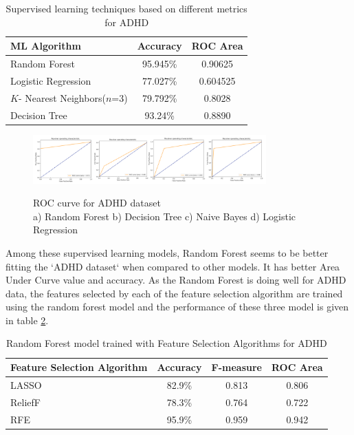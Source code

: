 \begin{table}[h]
\begin{center}
\begin{tabular}{|l|c|c|}
\hline
\textbf{ML Algorithm }& \textbf{Accuracy}&	\textbf{ROC Area}\\
\hline \hline
Random Forest&	95.945\%&	0.90625\\
\hline
Logistic Regression&	77.027\%&	0.604525\\
\hline
$K$- Nearest Neighbors($n$=3)&	79.792\%	&0.8028\\
\hline
Decision Tree&	93.24\%&	0.8890\\
\hline
\end{tabular}
\end{center}
\caption{Supervised learning techniques based on different metrics for ADHD }
\label{table:67}
\end{table}

\begin{figure}
\centering
  {\includegraphics[width=0.8\textwidth]{Figures/Figure_6_3.png}}
  \caption{ ROC curve for ADHD dataset \\ a) Random Forest b) Decision Tree c) Naive Bayes d) Logistic Regression }
  \label{fig:63}
\end{figure}

Among these supervised learning models, Random Forest seems to be better fitting the `ADHD dataset` when compared to other models. It has better Area Under Curve value and accuracy. As the Random Forest is doing well for ADHD data, the features selected by each of the feature selection algorithm are trained using the random forest model and the performance of these three model is given in table \ref{table:68}.
\begin{table}[h]
\begin{center}
\begin{tabular}{|l|c|c|c|}
\hline
\textbf{Feature Selection Algorithm}&	\textbf{Accuracy}&	\textbf{F-measure}&	\textbf{ROC Area}\\
\hline \hline
LASSO	&82.9\%&	0.813&	0.806\\
\hline
ReliefF &78.3\%	&0.764&	0.722\\
\hline
RFE &	95.9\%	&0.959&	0.942\\
\hline
\end{tabular}
\end{center}
\caption{ Random Forest model trained with Feature Selection Algorithms for ADHD}
\label{table:68}
\end{table}


